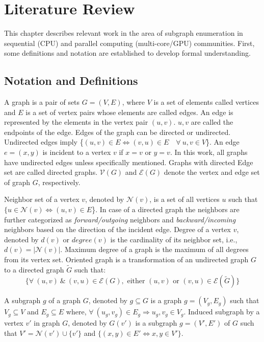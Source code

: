 \chapter{Literature Review}\label{chap:lit}

This chapter describes relevant work in the area of subgraph enumeration in sequential (CPU) and parallel computing (multi-core/GPU) communities.
First, some definitions and notation are established to develop formal understanding.

\section{Notation and Definitions}
A graph is a pair of sets $G=(V,E)$, where $V$ is a set of elements called vertices and $E$ is a set of vertex pairs whose elements are called edges.
An edge is represented by the elements in the vertex pair $(u,v)$.
$u, v$ are called the endpoints of the edge.
Edges of the graph can be directed or undirected.
Undirected edges imply \{$(u,v)\in E \Leftrightarrow (v,u) \in E \quad \forall ~ u, v \in V$\}.
An edge $e = (x,y)$ is incident to a vertex $v$ if $x=v$ or $y=v$.
In this work, all graphs have undirected edges unless specifically mentioned.
Graphs with directed Edge set are called directed graphs.
$\mathcal{V}(G)$  and $\mathcal{E}(G)$ denote the vertex and edge set of graph $G$, respectively.

Neighbor set of a vertex $v$, denoted by $\mathcal{N}(v)$, is a set of all vertices $u$ such that $\{u \in \mathcal{N}(v) \Leftrightarrow (u,v) \in E$\}.
In case of a directed graph the neighbors are further categorized as \textit{forward/outgoing} neighbors and \textit{backward/incoming} neighbors based on the direction of the incident edge.
Degree of a vertex $v$, denoted by $d(v)$ or $degree(v)$ is the cardinality of its neighbor set, i.e., $d(v)=|\mathcal{N}(v)|$.
Maximum degree of a graph is the maximum of all degrees from its vertex set.
Oriented graph is a transformation of an undirected graph $G$ to a directed graph $\tilde{G}$ such that: $$\{\forall~ (u,v) ~\& ~ (v,u) \in \mathcal{E}(G), \text{ either } (u,v) \text{ or } (v,u) \in \mathcal{E}(\tilde{G})\}$$

\newpage
A subgraph $g$ of a graph $G$, denoted by $g \subseteq G$ is a graph $g=(V_g, E_g)$ such that $V_g \subseteq V$ and $E_g \subseteq E$ where, $\forall~ (u_g, v_g) \in E_g \Rightarrow u_g, v_g \in V_g$.
Induced subgraph by a vertex $v'$ in graph $G$, denoted by $G(v')$ is a subgraph $g=(V', E')$ of $G$ such that $V'=\mathcal{N}(v')\cup \{v'\}$ and $\{(x,y) \in E'\Leftrightarrow {x,y} \in V'\}$.

